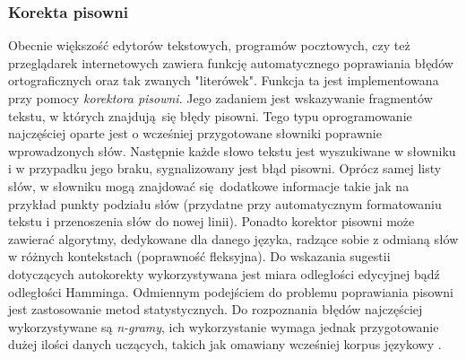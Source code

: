 \documentclass[a4paper, twoside, 12pt]{report}
\begin{document}
            \subsubsection{Korekta pisowni}
                Obecnie większość edytorów tekstowych, programów pocztowych, czy też przeglądarek internetowych zawiera
                funkcję automatycznego poprawiania błędów ortograficznych
                oraz tak zwanych "literówek". Funkcja ta jest implementowana przy pomocy \emph{korektora pisowni}. Jego
                zadaniem jest wskazywanie fragmentów tekstu, w których znajdują się błędy pisowni. Tego typu oprogramowanie
                najczęściej oparte jest o wcześniej przygotowane słowniki poprawnie wprowadzonych słów. Następnie każde
                słowo tekstu jest wyszukiwane w słowniku i w przypadku jego braku, sygnalizowany jest błąd pisowni. Oprócz
                samej listy słów, w słowniku mogą znajdować się dodatkowe informacje takie jak na przykład punkty podziału
                słów (przydatne przy automatycznym formatowaniu tekstu i przenoszenia słów do nowej linii). Ponadto korektor
                pisowni może zawierać algorytmy, dedykowane dla danego języka, radzące sobie z odmianą słów w różnych
                kontekstach (poprawność fleksyjna). Do wskazania sugestii dotyczących autokorekty wykorzystywana jest miara
                odległości edycyjnej bądź odległości Hamminga. Odmiennym podejściem do problemu poprawiania pisowni jest zastosowanie
                metod statystycznych. Do rozpoznania błędów najczęściej wykorzystywane są \emph{n-gramy}, ich wykorzystanie
                wymaga jednak przygotowanie dużej ilości danych uczących, takich jak omawiany wcześniej korpus językowy
                \cite{SPELLCHECKING}.
\end{document}
